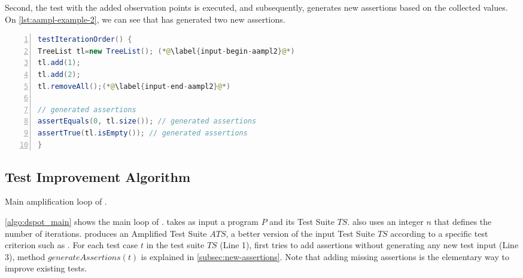 Second, the test with the added observation points is executed, and subsequently, \dspot{} generates new assertions based on the collected values. On \autoref{lst:aampl-example-2}, we can see that \dspot has generated two new assertions.

\begin{lstlisting}[caption={In \Aampl{}, the last step is to generate the assertions based on the collected values.},label=lst:aampl-example-2,float,language=java,numbers=left] 
testIterationOrder() {
TreeList tl=new TreeList(); (*@\label{input-begin-aampl2}@*)
tl.add(1);
tl.add(2);
tl.removeAll();(*@\label{input-end-aampl2}@*)

// generated assertions
assertEquals(0, tl.size()); // generated assertions
assertTrue(tl.isEmpty()); // generated assertions
}
\end{lstlisting}

\subsection{Test Improvement Algorithm}
\label{subsec:algo}

\begin{algorithm}[t]
	\begin{algorithmic}[1]
		\EndFor
		\EndFor
		\EndFor
	\end{algorithmic}
	\caption{Main amplification loop of \dspot.}
	\label{algo:dspot_main}
\end{algorithm}

\autoref{algo:dspot_main} shows the main loop of \dspot. 
\dspot takes as input a program $P$ and its Test Suite $TS$. \dspot also uses an integer $n$ that defines the number of iterations.
\dspot produces an Amplified Test Suite $ATS$, \ie a better version of the input Test Suite $TS$ according to a specific test criterion such as \ms.
For each test case $t$ in the test suite $TS$ (Line 1), \dspot first tries to add assertions without generating any new test input (Line 3),  method $generateAssertions\left(t\right)$ is explained in \autoref{subsec:new-assertions}.
Note that adding missing assertions is the elementary way to improve existing tests.

